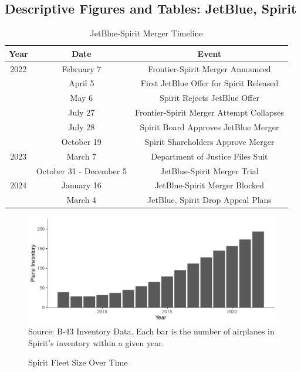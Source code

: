 \documentclass{article}
\begin{document}
\begin{appendices}
\FloatBarrier
	
	\subsection{Descriptive Figures and Tables: JetBlue, Spirit}

	
	\begin{table}[h]
		\caption{JetBlue-Spirit Merger Timeline}
		\label{tab:JetBlue_Spirit_Timeline}
		\begin{center}
			\begin{tabular}{ccc}
				\hline
				Year & Date & Event \\
				\hline
				2022 & February 7 & Frontier-Spirit Merger Announced \\
				& April 5 &  First JetBlue Offer for Spirit Released\\
				& May 6 & Spirit Rejects JetBlue Offer \\
				& July 27 &  Frontier-Spirit Merger Attempt Collapses\\
				& July 28 &  Spirit Board Approves JetBlue Merger\\
				& October 19 & Spirit Shareholders Approve Merger \\
				\hline
				2023 & March 7 &  Department of Justice Files Suit\\
				& October 31 - December 5 &  JetBlue-Spirit Merger Trial \\
				\hline
				2024 & January 16 & JetBlue-Spirit Merger Blocked \\
				& March 4 & JetBlue, Spirit Drop Appeal Plans \\
			\end{tabular}
		\end{center}
	\end{table}

	\begin{figure}
	\caption{Spirit Fleet Size Over Time}
	\label{fig:Spirit_fleet}
	\includegraphics[width = \linewidth]{Spirit_Planes.pdf}
	\footnotesize{Source: B-43 Inventory Data. Each bar is the number of airplanes in Spirit's inventory within a given year. }
\end{figure}


\end{appendices}
\end{document}
